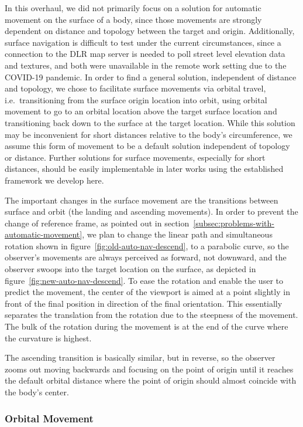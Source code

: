 In this overhaul, we did not primarily focus on a solution for automatic movement on the surface of a body, since
those movements are strongly dependent on distance and topology between the target and origin.
Additionally, surface navigation is difficult to test under the current circumstances, since a connection to the DLR
map server is needed to poll street level elevation data and textures, and both were unavailable in the remote work
setting due to the COVID-19 pandemic.
In order to find a general solution, independent of distance and topology, we chose to facilitate surface movements
via orbital travel, i.e.\ transitioning from the surface origin location into orbit, using orbital movement to go to an
orbital location above the target surface location and transitioning back down to the surface at the target location.
While this solution may be inconvenient for short distances relative to the body's circumference, we assume this form
of movement to be a default solution independent of topology or distance.
Further solutions for surface movements, especially for short distances, should be easily implementable in later
works using the established framework we develop here.

The important changes in the surface movement are the transitions between surface and orbit (the landing and
ascending movements).
In order to prevent the change of reference frame, as pointed out in
section~\ref{subsec:problems-with-automatic-movement}, we plan to change the linear path and simultaneous rotation
shown in figure~\ref{fig:old-auto-nav-descend}, to a parabolic curve, so the observer's movements are always
perceived as forward, not downward, and the observer swoops into the target location on the surface, as depicted in
figure~\ref{fig:new-auto-nav-descend}.
To ease the rotation and enable the user to predict the movement, the center of the viewport is aimed at a point
slightly in front of the final position in direction of the final orientation.
This essentially separates the translation from the rotation due to the steepness of the movement.
The bulk of the rotation during the movement is at the end of the curve where the curvature is highest.

The ascending transition is basically similar, but in reverse, so the observer zooms out moving backwards and
focusing on the point of origin until it reaches the default orbital distance where the point of origin should almost
coincide with the body's center.

\subsubsection{Orbital Movement}\label{subsubsec:orbital-movements}

